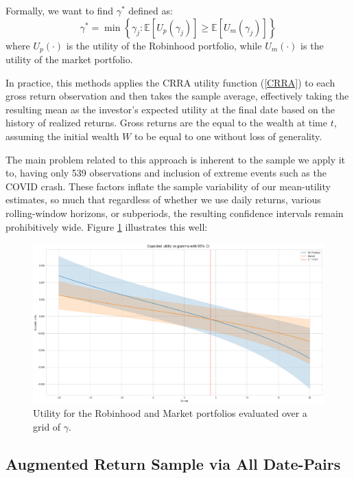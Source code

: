 Formally, we want to find $\gamma^*$ defined as:
\begin{equation}
    \gamma^* = \min\left\{ \gamma_j : \mathbb{E}[U_p(\gamma_j)] \geq \mathbb{E}[U_m(\gamma_j)] \right\}
    \label{gamma_cutoff}
\end{equation}
where $U_p(\cdot)$ is the utility of the Robinhood portfolio, while $U_m(\cdot)$ is the utility of the market portfolio.

In practice, this methods applies the CRRA utility function (\ref{CRRA}) to each gross return observation and then takes the sample average,
effectively taking the resulting mean as the investor's expected utility at the final date based on the history of realized returns.
Gross returns are the equal to the wealth at time $t$, assuming the initial wealth $W$ to be equal to one without loss of generality.

The main problem related to this approach is inherent to the sample we apply it to, having only 539 observations and inclusion of extreme events such as the COVID crash. 
These factors inflate the sample variability of our mean-utility estimates, so much that regardless of whether we use daily returns, various rolling-window horizons, or subperiods, the resulting confidence intervals remain prohibitively wide.
Figure \ref{fig:cutoff} illustrates this well: 
\begin{figure}[h!]
    \centering
    \includegraphics[width=\linewidth]{../images/risk/cutoff_daily.png}
    \caption{Utility for the Robinhood and Market portfolios evaluated over a grid of $\gamma$.}
    \label{fig:cutoff}
\end{figure}

\subsection{Augmented Return Sample via All Date-Pairs}

